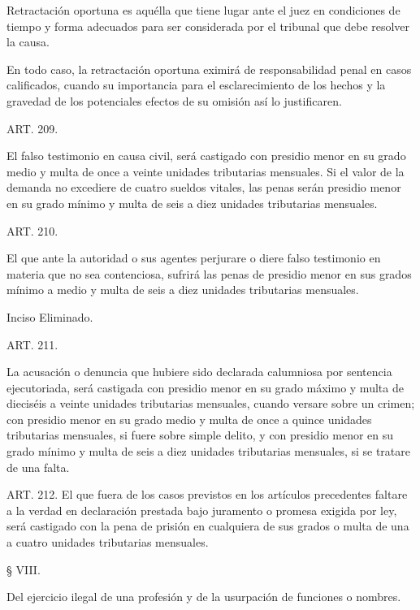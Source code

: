     Retractación oportuna es aquélla que tiene lugar ante el juez en condiciones de tiempo y forma adecuados para ser considerada por el tribunal que debe resolver la causa.

    En todo caso, la retractación oportuna eximirá de responsabilidad penal en casos calificados, cuando su importancia para el esclarecimiento de los hechos y la gravedad de los potenciales efectos de su omisión así lo justificaren.


    ART. 209.

    El falso testimonio en causa civil, será castigado con presidio menor en su grado medio y multa de once a veinte unidades tributarias mensuales.
    Si el valor de la demanda no excediere de cuatro sueldos vitales, las penas serán presidio menor en su grado mínimo y multa de seis a diez unidades tributarias mensuales.









    ART. 210.

    El que ante la autoridad o sus agentes perjurare o diere falso testimonio en materia que no sea contenciosa, sufrirá las penas de presidio menor en sus grados mínimo a medio y multa de seis a diez unidades tributarias mensuales.

    Inciso Eliminado.


    ART. 211.

    La acusación o denuncia que hubiere sido declarada calumniosa por sentencia ejecutoriada, será castigada con presidio menor en su grado máximo y multa de dieciséis a veinte unidades tributarias mensuales, cuando versare sobre un crimen; con presidio menor en su grado medio y multa de once a quince unidades tributarias mensuales, si fuere sobre simple delito, y con presidio menor en su grado mínimo y multa de seis a diez unidades tributarias mensuales, si se tratare de una falta.




    ART. 212.
    El que fuera de los casos previstos en los artículos precedentes faltare a la verdad en declaración prestada bajo juramento o promesa exigida por ley, será castigado con la pena de prisión en cualquiera de sus grados o multa de una a cuatro unidades tributarias mensuales.

    § VIII.

    Del ejercicio ilegal de una profesión y de la usurpación de funciones o nombres.



